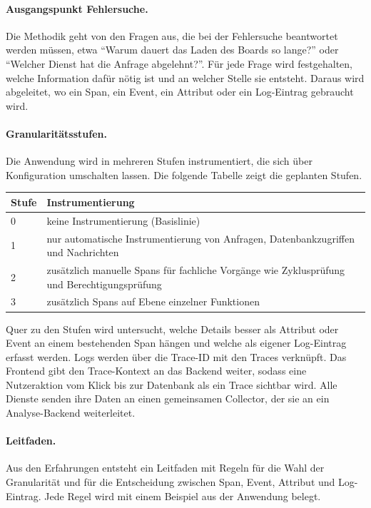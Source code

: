 \documentclass[11pt, a4paper]{article}
\begin{document}
\paragraph{Ausgangspunkt Fehlersuche.} Die Methodik geht von den Fragen aus, die bei der Fehlersuche beantwortet werden müssen, etwa \enquote{Warum dauert das Laden des Boards so lange?} oder \enquote{Welcher Dienst hat die Anfrage abgelehnt?}. Für jede Frage wird festgehalten, welche Information dafür nötig ist und an welcher Stelle sie entsteht. Daraus wird abgeleitet, wo ein Span, ein Event, ein Attribut oder ein Log-Eintrag gebraucht wird.

\paragraph{Granularitätsstufen.} Die Anwendung wird in mehreren Stufen instrumentiert, die sich über Konfiguration umschalten lassen. Die folgende Tabelle zeigt die geplanten Stufen.

\begin{center}
\small
\begin{tabularx}{\textwidth}{@{}l X@{}}
\toprule
\textbf{Stufe} & \textbf{Instrumentierung} \\
\midrule
0 & keine Instrumentierung (Basislinie) \\
1 & nur automatische Instrumentierung von Anfragen, Datenbankzugriffen und Nachrichten \\
2 & zusätzlich manuelle Spans für fachliche Vorgänge wie Zyklusprüfung und Berechtigungsprüfung \\
3 & zusätzlich Spans auf Ebene einzelner Funktionen \\
\bottomrule
\end{tabularx}
\end{center}

Quer zu den Stufen wird untersucht, welche Details besser als Attribut oder Event an einem bestehenden Span hängen und welche als eigener Log-Eintrag erfasst werden. Logs werden über die Trace-ID mit den Traces verknüpft. Das Frontend gibt den Trace-Kontext an das Backend weiter, sodass eine Nutzeraktion vom Klick bis zur Datenbank als ein Trace sichtbar wird. Alle Dienste senden ihre Daten an einen gemeinsamen Collector, der sie an ein Analyse-Backend weiterleitet.

\paragraph{Leitfaden.} Aus den Erfahrungen entsteht ein Leitfaden mit Regeln für die Wahl der Granularität und für die Entscheidung zwischen Span, Event, Attribut und Log-Eintrag. Jede Regel wird mit einem Beispiel aus der Anwendung belegt.
\end{document}
